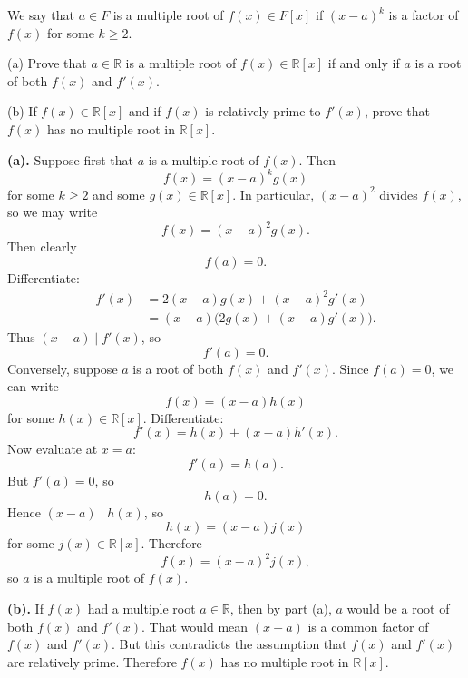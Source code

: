 \begin{problem}{
    We say that $a\in F$ is a multiple root of $f(x)\in F[x]$ if $(x-a)^k$ is a factor of $f(x)$ for some $k\geq 2$.

    (a) Prove that $a\in\mathbb{R}$ is a multiple root of $f(x)\in\mathbb{R}[x]$ if and only if $a$ is a root of both $f(x)$ and $f'(x)$.

    (b) If $f(x)\in\mathbb{R}[x]$ and if $f(x)$ is relatively prime to $f'(x)$, prove that $f(x)$ has no multiple root in $\mathbb{R}[x]$.
}
    \textbf{(a).}
    Suppose first that $a$ is a multiple root of $f(x)$.
    Then
    \[
        f(x)=(x-a)^k g(x)
    \]
    for some $k\geq 2$ and some $g(x)\in\mathbb{R}[x]$.
    In particular, $(x-a)^2$ divides $f(x)$, so we may write
    \[
        f(x)=(x-a)^{2}g(x).
    \]
    Then clearly
    \[
        f(a)=0.
    \]
    Differentiate:
    \begin{align*}
        f'(x)
        &=
        2(x-a)g(x)+(x-a)^{2}g'(x)\\
        &=
        (x-a)\bigl(2g(x)+(x-a)g'(x)\bigr).
    \end{align*}
    Thus $(x-a)\mid f'(x)$, so
    \[
        f'(a)=0.
    \]
    Conversely, suppose $a$ is a root of both $f(x)$ and $f'(x)$.
    Since $f(a)=0$, we can write
    \[
        f(x)=(x-a)h(x)
    \]
    for some $h(x)\in\mathbb{R}[x]$.
    Differentiate:
    \[
        f'(x)=h(x)+(x-a)h'(x).
    \]
    Now evaluate at $x=a$:
    \[
        f'(a)=h(a).
    \]
    But $f'(a)=0$, so
    \[
        h(a)=0.
    \]
    Hence $(x-a)\mid h(x)$, so
    \[
        h(x)=(x-a)j(x)
    \]
    for some $j(x)\in\mathbb{R}[x]$.
    Therefore
    \[
        f(x)=(x-a)^{2}j(x),
    \]
    so $a$ is a multiple root of $f(x)$.

    \textbf{(b).}
    If $f(x)$ had a multiple root $a\in\mathbb{R}$, then by part (a), $a$ would be a root of both $f(x)$ and $f'(x)$.
    That would mean $(x-a)$ is a common factor of $f(x)$ and $f'(x)$.
    But this contradicts the assumption that $f(x)$ and $f'(x)$ are relatively prime.
    Therefore $f(x)$ has no multiple root in $\mathbb{R}[x]$.
\end{problem}


